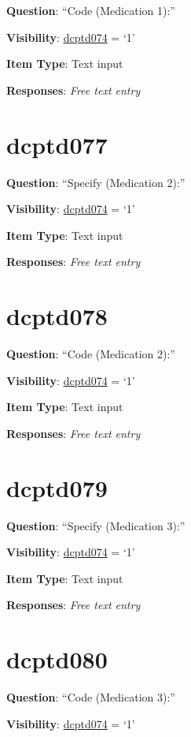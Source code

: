 \documentclass[]{book}
\begin{document}
\textbf{Question}: ``Code (Medication 1):''

\textbf{Visibility}: \protect\hyperlink{dcptd074}{dcptd074} = `1'

\textbf{Item Type}: Text input

\textbf{Responses}: \emph{Free text entry}

\hypertarget{dcptd077}{%
\section{dcptd077}\label{dcptd077}}

\textbf{Question}: ``Specify (Medication 2):''

\textbf{Visibility}: \protect\hyperlink{dcptd074}{dcptd074} = `1'

\textbf{Item Type}: Text input

\textbf{Responses}: \emph{Free text entry}

\hypertarget{dcptd078}{%
\section{dcptd078}\label{dcptd078}}

\textbf{Question}: ``Code (Medication 2):''

\textbf{Visibility}: \protect\hyperlink{dcptd074}{dcptd074} = `1'

\textbf{Item Type}: Text input

\textbf{Responses}: \emph{Free text entry}

\hypertarget{dcptd079}{%
\section{dcptd079}\label{dcptd079}}

\textbf{Question}: ``Specify (Medication 3):''

\textbf{Visibility}: \protect\hyperlink{dcptd074}{dcptd074} = `1'

\textbf{Item Type}: Text input

\textbf{Responses}: \emph{Free text entry}

\hypertarget{dcptd080}{%
\section{dcptd080}\label{dcptd080}}

\textbf{Question}: ``Code (Medication 3):''

\textbf{Visibility}: \protect\hyperlink{dcptd074}{dcptd074} = `1'
\end{document}
